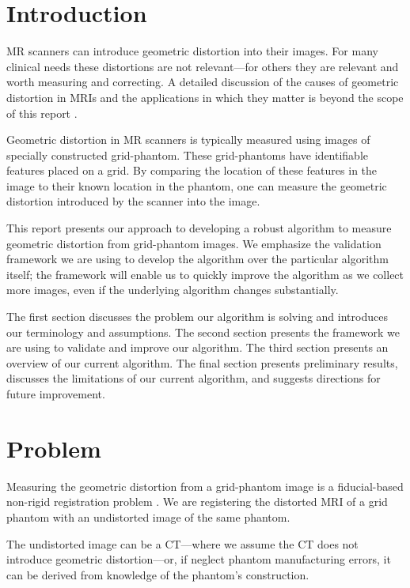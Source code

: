 \documentclass[12pt]{article}
\begin{document}
\maketitle

\section{Introduction}
MR scanners can introduce geometric distortion into their images.  For many clinical needs these distortions are not relevant---for others they are relevant and worth measuring and correcting.  A detailed discussion of the causes of geometric distortion in MRIs and the applications in which they matter is beyond the scope of this report \cite{baldwin2007,torfeh2015,wang2005,mribook}.  

Geometric distortion in MR scanners is typically measured using images of specially constructed grid-phantom.  These grid-phantoms have identifiable features placed on a grid.  By comparing the location of these features in the image to their known location in the phantom, one can measure the geometric distortion introduced by the scanner into the image.

This report presents our approach to developing a robust algorithm to measure geometric distortion from grid-phantom images.  We emphasize the validation framework we are using to develop the algorithm over the particular algorithm itself; the framework will enable us to quickly improve the algorithm as we collect more images, even if the underlying algorithm changes substantially.

The first section discusses the problem our algorithm is solving and introduces our terminology and assumptions.  The second section presents the framework we are using to validate and improve our algorithm.  The third section presents an overview of our current algorithm.  The final section presents preliminary results, discusses the limitations of our current algorithm, and suggests directions for future improvement.

\section{Problem}
Measuring the geometric distortion from a grid-phantom image is a fiducial-based non-rigid registration problem \cite{hill2001}.  We are registering the distorted MRI of a grid phantom with an undistorted image of the same phantom.

The undistorted image can be a CT---where we assume the CT does not introduce geometric distortion---or, if neglect phantom manufacturing errors, it can be derived from knowledge of the phantom's construction.
\end{document}
